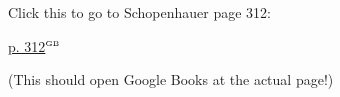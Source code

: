 \documentclass{article}
\makeatletter
\newcommand{\getgblink}[2]{\csname gblink@#1@#2\endcsname}
\makeatother
\begin{document}
Click this to go to Schopenhauer page 312:

{\color{gbcolor}\href{\getgblink{Schopenhauer}{p.~312}}{p. 312$^{\text{\tiny GB}}$}}

(This should open Google Books at the actual page!)
\end{document}
